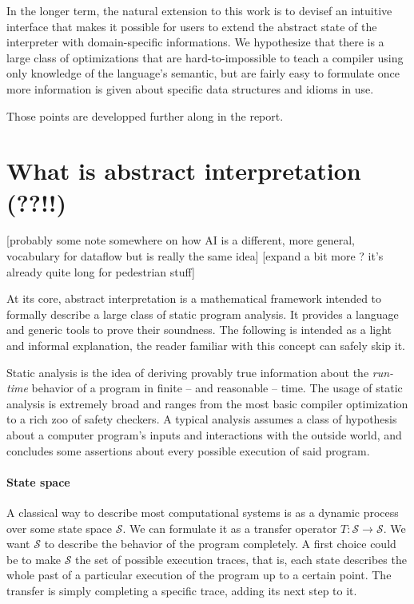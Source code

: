 \documentclass[11pt]{article}
\renewcommand{\S}{\mathcal{S}}
\begin{document}
In the longer term, the natural extension to this work is to devisef an intuitive interface that makes it possible for users to extend the abstract state of the interpreter with domain-specific informations. We hypothesize that there is a large class of optimizations that are hard-to-impossible to teach a compiler using only knowledge of the language's semantic, but are fairly easy to formulate once more information is given about specific data structures and idioms in use.

Those points are developped further along in the report.

\break

\section*{What is abstract interpretation (??!!)}

[probably some note somewhere on how AI is a different, more general, vocabulary for dataflow but is really the same idea]
[expand a bit more ? it's already quite long for pedestrian stuff]


At its core, abstract interpretation is a mathematical framework intended to formally describe a large class of static program analysis.
It provides a language and generic tools to prove their soundness.
The following is intended as a light and informal explanation, the reader familiar with this concept can safely skip it.

Static analysis is the idea of deriving provably true information about the \emph{run-time} behavior of a program in finite -- and reasonable -- time.
The usage of static analysis is extremely broad and ranges from the most basic compiler optimization to a rich zoo of safety checkers.
A typical analysis assumes a class of hypothesis about a computer program's inputs and interactions with the outside world, and concludes some assertions
about every possible execution of said program.

\paragraph{State space} A classical way to describe most computational systems is as a dynamic process over some state space $\S$. We can formulate it as a transfer operator $T:\S\to\S$. We want $\S$ to describe the behavior of the program completely. A first choice could be to make $\S$ the set of possible execution traces, that is, each state describes the whole past of a particular execution of the program up to a certain point. The transfer is simply completing a specific trace, adding its next step to it.
\end{document}
